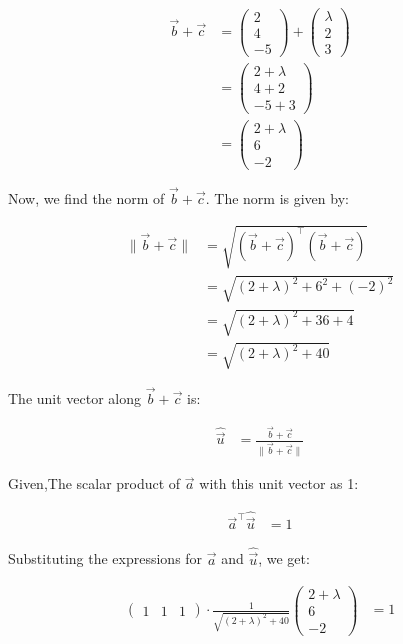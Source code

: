 \documentclass[journal]{IEEEtran}
\numberwithin{figure}{enumi}
\begin{document}
\begin{align}
\vec{b} + \vec{c} &= \begin{pmatrix} 2 \\ 4 \\ -5 \end{pmatrix} + \begin{pmatrix} \lambda \\ 2 \\ 3 \end{pmatrix} \\
&= \begin{pmatrix} 2 + \lambda \\ 4 + 2 \\ -5 + 3 \end{pmatrix} \\
&= \begin{pmatrix} 2 + \lambda \\ 6 \\ -2 \end{pmatrix}
\end{align}

Now, we find the norm of $\vec{b} + \vec{c}$. The norm is given by:

\begin{align}
\|\vec{b} + \vec{c}\| &= \sqrt{(\vec{b} + \vec{c})^\top (\vec{b} + \vec{c})} \\
&= \sqrt{(2 + \lambda)^2 + 6^2 + (-2)^2} \\
&= \sqrt{(2 + \lambda)^2 + 36 + 4} \\
&= \sqrt{(2 + \lambda)^2 + 40}
\end{align}

The unit vector along $\vec{b} + \vec{c}$ is:

\begin{align}
\hat{\vec{u}} &= \frac{\vec{b} + \vec{c}}{\|\vec{b} + \vec{c}\|}
\end{align}

Given,The scalar product of $\vec{a}$ with this unit vector as 1:

\begin{align}
\vec{a}^\top \hat{\vec{u}} &= 1
\end{align}

Substituting the expressions for $\vec{a}$ and $\hat{\vec{u}}$, we get:

\begin{align}
\begin{pmatrix} 1 & 1 & 1 \end{pmatrix} \cdot \frac{1}{\sqrt{(2 + \lambda)^2 + 40}} \begin{pmatrix} 2 + \lambda \\ 6 \\ -2 \end{pmatrix} &= 1
\end{align}
\end{document}
